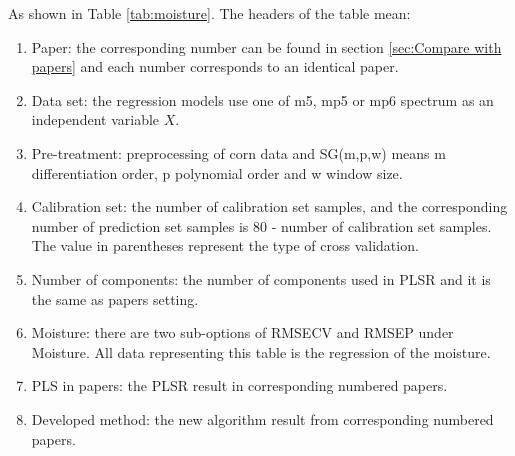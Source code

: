 \documentclass[a4paper,12pt,titlepage]{article} %
\numberwithin{equation}{section}  %
\begin{document}
	As shown in Table \ref{tab:moisture}. The headers of the table mean:
	
	\begin{enumerate}
		
	\item Paper: the corresponding number can be found in section \ref{sec:Compare with papers} and each number corresponds to an identical paper.
	
	\item Data set: the regression models use one of m5, mp5 or mp6 spectrum as an independent variable $X$.
	
	\item Pre-treatment: preprocessing of corn data and SG(m,p,w) means m differentiation order, p polynomial order and w window size.
	
	\item Calibration set: the number of calibration set samples, and the corresponding number of prediction set samples is 80 - number of calibration set samples. The value in parentheses represent the type of cross validation.
	
	\item Number of components: the number of  components used in PLSR and it is the same as papers setting.
	
	\item Moisture: there are two sub-options of RMSECV and RMSEP under Moisture. All data representing this table is the regression of the moisture.
	
	\item PLS in papers: the PLSR result in corresponding numbered papers.
	
	\item Developed method: the new algorithm result from corresponding numbered papers.
	
\end{enumerate}
	
\end{document}
